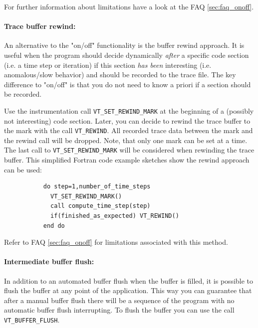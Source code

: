 \documentclass[a4paper,twoside,12pt,BCOR12mm]{scrbook}
\begin{document}
  For further information about limitations have a look at the FAQ \ref{sec:faq_onoff}.

\paragraph{Trace buffer rewind:}
  An alternative to the "on/off" functionality is the buffer rewind
  approach. It is useful when the program should decide dynamically \textit{after} a
  specific code section (i.e. a time step or iteration) if this section
  \textit{has been} interesting (i.e. anomalous/slow behavior) and should be
  recorded to the trace file.
  The key difference to "on/off" is that you do not need to know a priori if a section
  should be recorded.
  
  Use the instrumentation call \texttt{VT\_SET\_REWIND\_MARK} at the beginning of
  a (possibly not interesting) code section.
  Later, you can decide to rewind the trace buffer to the mark with the call  
  \texttt{VT\_REWIND}.
  All recorded trace data between the mark and the rewind call will be dropped.
  Note, that only one mark can be set at a time. The last call to
  \texttt{VT\_SET\_REWIND\_MARK} will be considered when rewinding the trace buffer.
  This simplified Fortran code example sketches show the rewind approach can be used:
\begin{verbatim}
           do step=1,number_of_time_steps
             VT_SET_REWIND_MARK()
             call compute_time_step(step)
             if(finished_as_expected) VT_REWIND()
           end do
\end{verbatim}
  Refer to FAQ \ref{sec:faq_onoff} for limitations associated with this method.

\paragraph{Intermediate buffer flush:}
  In addition to an automated buffer flush when the buffer is filled, it is
  possible to flush the buffer at any point of the application. This way you can
  guarantee that after a manual buffer flush there will be a sequence of the program
  with no automatic buffer flush interrupting. To flush the buffer you can use the
  call \texttt{VT\_BUFFER\_FLUSH}.
\end{document}
